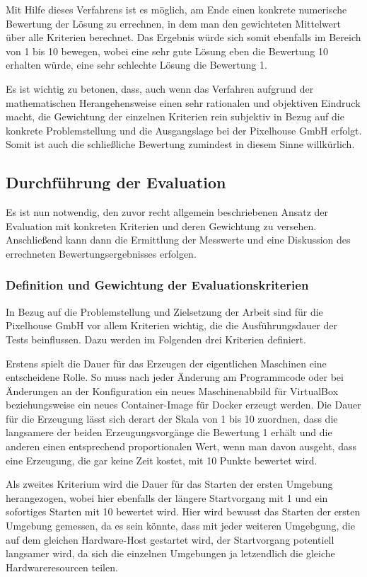 Mit Hilfe dieses Verfahrens ist es möglich, am Ende einen konkrete numerische Bewertung der Lösung zu errechnen, in dem man den gewichteten Mittelwert über alle Kriterien berechnet. Das Ergebnis würde sich somit ebenfalls im Bereich von 1 bis 10 bewegen, wobei eine sehr gute Lösung eben die Bewertung 10 erhalten würde, eine sehr schlechte Lösung die Bewertung 1.

Es ist wichtig zu betonen, dass, auch wenn das Verfahren aufgrund der mathematischen Herangehensweise einen sehr rationalen und objektiven Eindruck macht, die Gewichtung der einzelnen Kriterien rein subjektiv in Bezug auf die konkrete Problemstellung und die Ausgangslage bei der Pixelhouse GmbH erfolgt. Somit ist auch die schließliche Bewertung zumindest in diesem Sinne willkürlich.

\subsection{Durchführung der Evaluation}

Es ist nun notwendig, den zuvor recht allgemein beschriebenen Ansatz der Evaluation mit konkreten Kriterien und deren Gewichtung zu versehen. Anschließend kann dann die Ermittlung der Messwerte und eine Diskussion des errechneten Bewertungsergebnisses erfolgen.

\subsubsection{Definition und Gewichtung der Evaluationskriterien}

In Bezug auf die Problemstellung und Zielsetzung der Arbeit sind für die Pixelhouse GmbH vor allem Kriterien wichtig, die die Ausführungsdauer der Tests beinflussen. Dazu werden im Folgenden drei Kriterien definiert.

Erstens spielt die Dauer für das Erzeugen der eigentlichen Maschinen eine entscheidene Rolle. So muss nach jeder Änderung am Programmcode oder bei Änderungen an der Konfiguration ein neues Maschinenabbild für VirtualBox beziehungsweise ein neues Container-Image für Docker erzeugt werden. Die Dauer für die Erzeugung lässt sich derart der Skala von 1 bis 10 zuordnen, dass die langsamere der beiden Erzeugungsvorgänge die Bewertung 1 erhält und die anderen einen entsprechend proportionalen Wert, wenn man davon ausgeht, dass eine Erzeugung, die gar keine Zeit kostet, mit 10 Punkte bewertet wird.

Als zweites Kriterium wird die Dauer für das Starten der ersten Umgebung herangezogen, wobei hier ebenfalls der längere Startvorgang mit 1 und ein sofortiges Starten mit 10 bewertet wird. Hier wird bewusst das Starten der ersten Umgebung gemessen, da es sein könnte, dass mit jeder weiteren Umgebgung, die auf dem gleichen Hardware-Host gestartet wird, der Startvorgang potentiell langsamer wird, da sich die einzelnen Umgebungen ja letzendlich die gleiche Hardwareresourcen teilen.

